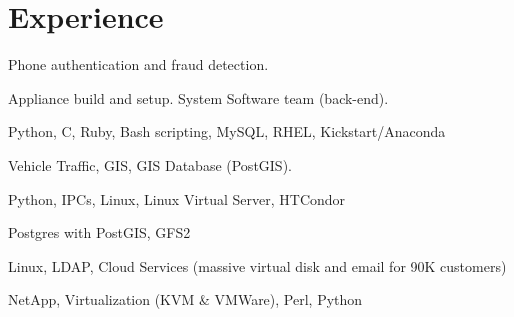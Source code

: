 \documentclass[letterpaper]{cvitae}
\begin{document}
\begin{minipage}[t]{0.64\textwidth}
\section{Experience}

\vspace{\topsep} %
\begin{tightitemize}
\item Phone authentication and fraud detection.
\item Appliance build and setup. System Software team (back-end).
\item Python, C, Ruby, Bash scripting, MySQL, RHEL, Kickstart/Anaconda
\end{tightitemize}

\sectionspace

\begin{tightitemize}
\item Vehicle Traffic, GIS, GIS Database (PostGIS).
\item Python, IPCs, Linux, Linux Virtual Server, HTCondor
\item Postgres with PostGIS, GFS2
\end{tightitemize}

\sectionspace

\vspace{\topsep} %
\begin{tightitemize}
\item Linux, LDAP, Cloud Services (massive virtual disk and email for 90K customers)
\item NetApp, Virtualization (KVM \& VMWare), Perl, Python
\end{tightitemize}

\sectionspace



\end{minipage}
\end{document}

